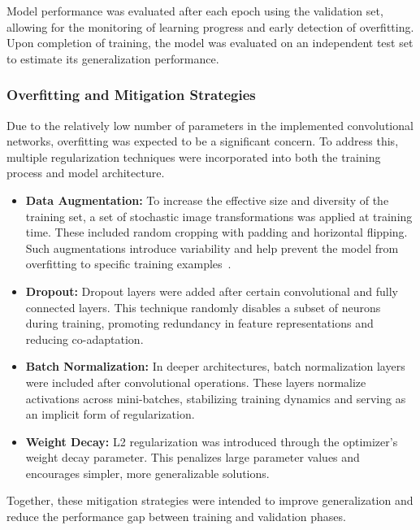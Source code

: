 \documentclass[journal,article,submit,pdftex,moreauthors]{Definitions/mdpi}
\begin{document}
Model performance was evaluated after each epoch using the validation set, allowing for the monitoring of learning progress and early detection of overfitting. Upon completion of training, the model was evaluated on an independent test set to estimate its generalization performance.

\subsubsection{Overfitting and Mitigation Strategies}

Due to the relatively low number of parameters in the implemented convolutional networks, overfitting was expected to be a significant concern. To address this, multiple regularization techniques were incorporated into both the training process and model architecture.

\begin{itemize}
    \item \textbf{Data Augmentation:} To increase the effective size and diversity of the training set, a set of stochastic image transformations was applied at training time. These included random cropping with padding and horizontal flipping. Such augmentations introduce variability and help prevent the model from overfitting to specific training examples~\cite{shorten2019}.

    \item \textbf{Dropout:} Dropout layers were added after certain convolutional and fully connected layers. This technique randomly disables a subset of neurons during training, promoting redundancy in feature representations and reducing co-adaptation.

    \item \textbf{Batch Normalization:} In deeper architectures, batch normalization layers were included after convolutional operations. These layers normalize activations across mini-batches, stabilizing training dynamics and serving as an implicit form of regularization.

    \item \textbf{Weight Decay:} L2 regularization was introduced through the optimizer's weight decay parameter. This penalizes large parameter values and encourages simpler, more generalizable solutions.
\end{itemize}

Together, these mitigation strategies were intended to improve generalization and reduce the performance gap between training and validation phases.
\end{document}
